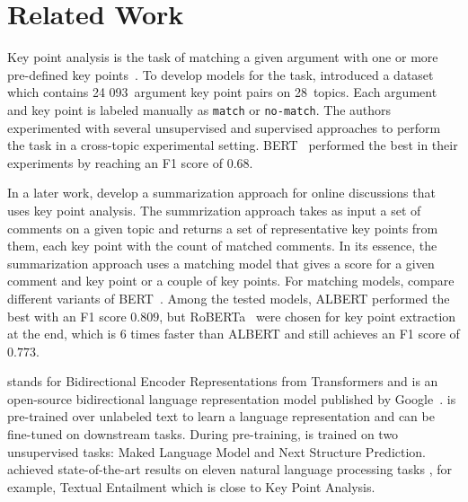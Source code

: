 \section{Related Work}\label{related-work}


Key point analysis is the task of matching a given argument with one or more pre-defined key points~\cite{Bar-HaimEFKLS2020}. To develop models for the task, \citet{Bar-HaimEFKLS2020} introduced a dataset \ArgKP which contains 24 093~argument key point pairs on 28~topics. Each argument and key point is labeled manually as \texttt{match} or \texttt{no-match}. The authors experimented with several unsupervised and supervised approaches to perform the task in a cross-topic experimental setting. BERT~\cite{DevlinCLT2019} performed the best in their experiments by reaching an F1 score of $0.68$.

In a later work, \citet{Bar-HaimKEFLS2020} develop a summarization approach for online discussions that
uses key point analysis. The summrization approach takes as input a set of comments on a given topic and returns a set of representative key points from them, each key point with the count of matched comments. In its essence, the summarization approach uses a matching model that gives a score for a given comment and key point or a couple of key points. For matching models, \citet{Bar-HaimKEFLS2020} compare different variants of BERT~\cite{DevlinCLT2019}. Among the tested models,
ALBERT \cite{lan2019albert} performed the best with an F1 score $0.809$, but RoBERTa~\cite{LiuOGDJCLLZS2019} were chosen for key point extraction at the end, which is 6 times faster than ALBERT and still achieves an F1 score of $0.773$. 

\Bert stands for Bidirectional Encoder Representations from Transformers and is an open-source bidirectional language representation model published by Google~\cite{DevlinCLT2019}. 
\Bert is pre-trained over unlabeled text to learn a language representation and can be fine-tuned on downstream tasks. During pre-training, \Bert is trained on two unsupervised tasks: Maked Language Model and Next Structure Prediction. \Bert achieved state-of-the-art results on eleven natural language processing tasks \cite{WangSMHLB2018}, for example, Textual Entailment which is close to Key Point Analysis.

